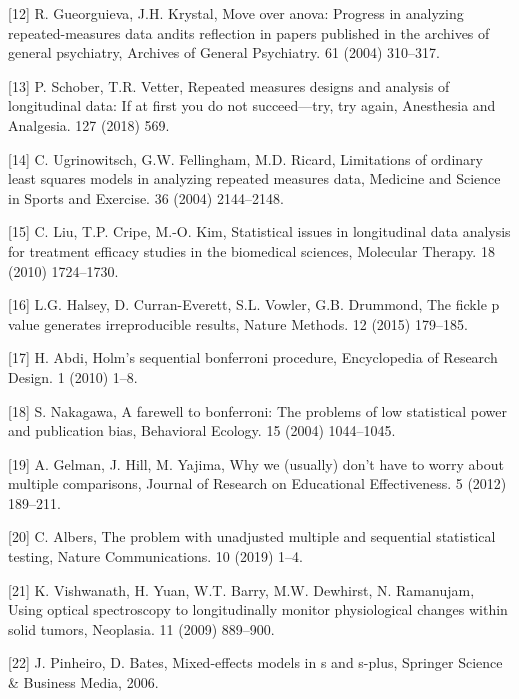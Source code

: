 \documentclass[
]{article}
\begin{document}
\leavevmode\hypertarget{ref-gueorguieva2004}{}%
{[}12{]} R. Gueorguieva, J.H. Krystal, Move over anova: Progress in analyzing repeated-measures data andits reflection in papers published in the archives of general psychiatry, Archives of General Psychiatry. 61 (2004) 310--317.

\leavevmode\hypertarget{ref-schober2018}{}%
{[}13{]} P. Schober, T.R. Vetter, Repeated measures designs and analysis of longitudinal data: If at first you do not succeed---try, try again, Anesthesia and Analgesia. 127 (2018) 569.

\leavevmode\hypertarget{ref-ugrinowitsch2004}{}%
{[}14{]} C. Ugrinowitsch, G.W. Fellingham, M.D. Ricard, Limitations of ordinary least squares models in analyzing repeated measures data, Medicine and Science in Sports and Exercise. 36 (2004) 2144--2148.

\leavevmode\hypertarget{ref-liu2010}{}%
{[}15{]} C. Liu, T.P. Cripe, M.-O. Kim, Statistical issues in longitudinal data analysis for treatment efficacy studies in the biomedical sciences, Molecular Therapy. 18 (2010) 1724--1730.

\leavevmode\hypertarget{ref-halsey2015}{}%
{[}16{]} L.G. Halsey, D. Curran-Everett, S.L. Vowler, G.B. Drummond, The fickle p value generates irreproducible results, Nature Methods. 12 (2015) 179--185.

\leavevmode\hypertarget{ref-abdi2010}{}%
{[}17{]} H. Abdi, Holm's sequential bonferroni procedure, Encyclopedia of Research Design. 1 (2010) 1--8.

\leavevmode\hypertarget{ref-nakagawa2004}{}%
{[}18{]} S. Nakagawa, A farewell to bonferroni: The problems of low statistical power and publication bias, Behavioral Ecology. 15 (2004) 1044--1045.

\leavevmode\hypertarget{ref-gelman2012}{}%
{[}19{]} A. Gelman, J. Hill, M. Yajima, Why we (usually) don't have to worry about multiple comparisons, Journal of Research on Educational Effectiveness. 5 (2012) 189--211.

\leavevmode\hypertarget{ref-albers2019}{}%
{[}20{]} C. Albers, The problem with unadjusted multiple and sequential statistical testing, Nature Communications. 10 (2019) 1--4.

\leavevmode\hypertarget{ref-vishwanath2009}{}%
{[}21{]} K. Vishwanath, H. Yuan, W.T. Barry, M.W. Dewhirst, N. Ramanujam, Using optical spectroscopy to longitudinally monitor physiological changes within solid tumors, Neoplasia. 11 (2009) 889--900.

\leavevmode\hypertarget{ref-pinheiro2006}{}%
{[}22{]} J. Pinheiro, D. Bates, Mixed-effects models in s and s-plus, Springer Science \& Business Media, 2006.
\end{document}
